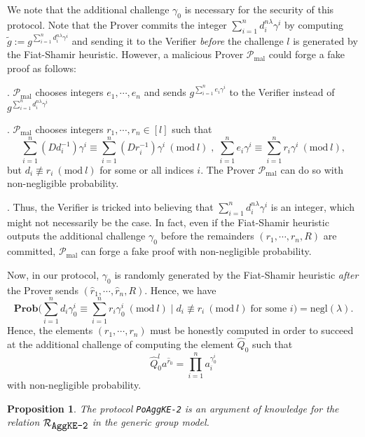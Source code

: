 \documentclass[11pt, lettersize, notitlepage, leqno, footskip=0.6cm]{article}
\newcommand{\pl}{\prod\limits}
\newcommand{\slim}{\sum\limits}
\newcommand{\negl}{\mr{negl}}
\newcommand{\wti}{\widetilde}
\newcommand{\mc}{\mathcal}
\newcommand{\mbf}{\mathbf}
\newcommand{\mr}{\mathrm}
\newcommand{\lam}{\lambda}
\newcommand{\what}{\widehat}
\newcommand{\Prob}{\mbf{Prob}}
\newcommand{\mP}{\mc{P}}
\newcommand{\vs}{\vspace{-0.15cm}}
\newcommand{\noin}{\noindent}
\newcommand{\Mod}[1]{\ (\mathrm{mod}\ #1)}
\newtheorem{Prop}[Thm]{Proposition}
\numberwithin{equation}{section}
\begin{document}
\vspace{0.2cm}

We note that the additional challenge $\gamma_0$ is necessary for the security of this protocol. Note that the Prover commits the integer $\slim_{i=1}^n d_i^{n\lam}\gamma^i$ by computing $\wti{g}:= g^{\slim_{i=1}^n d_i^{n\lam}\gamma^i}$ and sending it to the Verifier \textit{before} the challenge $l$ is generated by the Fiat-Shamir heuristic. However, a malicious Prover $\mP_{\mr{mal}}$ could forge a fake proof as follows:

\noin 1. $\mP_{\mr{mal}}$ chooses integers $e_1,\cdots,e_n$ and sends $g^{\slim_{i=1}^n e_i\gamma^i}$ to the Verifier instead of $g^{\slim_{i=1}^n d_i^{n\lam}\gamma^i}$

\noin 2. $\mP_{\mr{mal}}$ chooses integers $r_1,\cdots,r_n\in [l]$ such that \vs $$\slim_{i=1}^n (Dd_i^{-1})\gamma^i \equiv \slim_{i=1}^n (Dr_i^{-1})\gamma^i \Mod{l}\;,\; \slim_{i=1}^n e_i\gamma^i\equiv \slim_{i=1}^n r_i\gamma^i \Mod{l},$$ but $d_i\not\equiv r_i\Mod{l}$ for some or all indices $i$. The Prover $\mP_{\mr{mal}}$ can do so  with non-negligible probability.

\noin 3. Thus, the Verifier is tricked into believing that $\slim_{i=1}^n d_i^{n\lam}\gamma^i$ is an integer, which  might not necessarily be the case. In fact, even if the Fiat-Shamir heuristic outputs the additional challenge $\gamma_0$ before the remainders $(r_1,\cdots,r_n, R)$ are committed, $\mP_{\mr{mal}}$ can forge a fake proof with non-negligible probability. 

Now, in our protocol, $\gamma_0$ is randomly generated by the Fiat-Shamir heuristic \textit{after} the Prover sends $(\what{r}_1,\cdots,\what{r}_n, R)$. Hence, we have \vs $$\Prob\Big(\slim_{i=1}^n d_i\gamma_0^i \equiv \slim_{i=1}^n r_i\gamma_0^i \Mod{l}\;\Big|\; d_i\not\equiv r_i\Mod{l}\;\text{for some } i\Big) = \negl(\lam). $$ Hence, the elements $(r_1,\cdots,r_n)$ must be honestly computed in order to succeed at the additional challenge of computing the element $\what{Q}_0$ such that \vs $$\what{Q}_0^la^{\what{r}_0}= \pl_{i=1}^{n} a_i^{\gamma_0^i} $$ with non-negligible probability.

\noin 


\vspace{0.2cm}

\begin{Prop} The protocol \verb|PoAggKE-2| is an argument of knowledge for the relation $\mc{R}_{{\protect\verb|AggKE-2|}}$ in the generic group model.\end{Prop}
\end{document}

